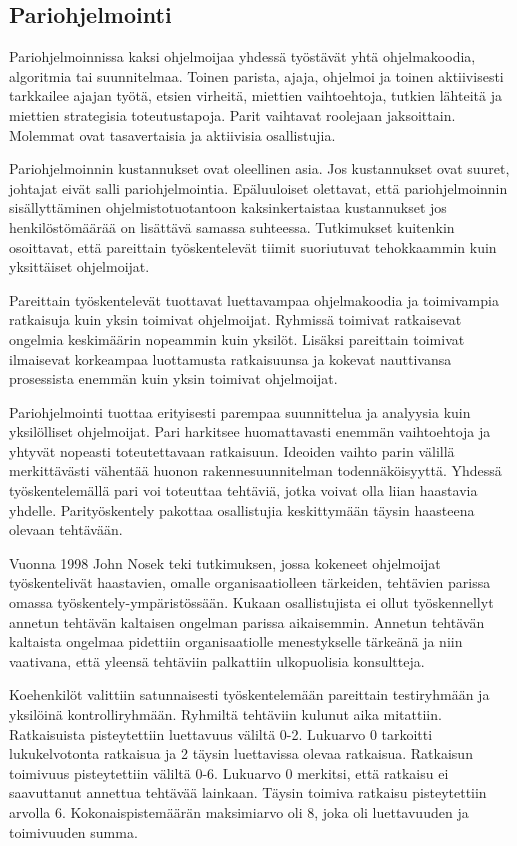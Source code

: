 \documentclass[finnish]{tktltiki2}
\theoremstyle{definition}
\theoremstyle{remark}
\begin{document}
\subsection{Pariohjelmointi}

Pariohjelmoinnissa kaksi ohjelmoijaa yhdessä työstävät yhtä ohjelmakoodia, algoritmia tai suunnitelmaa. Toinen parista, ajaja, ohjelmoi ja toinen aktiivisesti tarkkailee ajajan työtä, etsien virheitä, miettien vaihtoehtoja, tutkien lähteitä ja miettien strategisia toteutustapoja. Parit vaihtavat roolejaan jaksoittain. Molemmat ovat tasavertaisia ja aktiivisia osallistujia\cite{WIL00}.

Pariohjelmoinnin kustannukset ovat oleellinen asia. Jos kustannukset ovat suuret, johtajat eivät salli pariohjelmointia. Epäluuloiset olettavat, että pariohjelmoinnin sisällyttäminen ohjelmistotuotantoon kaksinkertaistaa kustannukset jos henkilöstömäärää on lisättävä samassa suhteessa. Tutkimukset kuitenkin osoittavat, että pareittain työskentelevät tiimit suoriutuvat tehokkaammin kuin yksittäiset ohjelmoijat\cite{NOS98}\cite{WIL00}.

Pareittain työskentelevät tuottavat luettavampaa ohjelmakoodia ja toimivampia ratkaisuja kuin yksin toimivat ohjelmoijat. Ryhmissä toimivat ratkaisevat ongelmia keskimäärin nopeammin kuin yksilöt. Lisäksi pareittain toimivat ilmaisevat korkeampaa luottamusta ratkaisuunsa ja kokevat nauttivansa prosessista enemmän kuin yksin toimivat ohjelmoijat\cite{NOS98}.   

Pariohjelmointi tuottaa erityisesti parempaa suunnittelua ja analyysia kuin yksilölliset ohjelmoijat. Pari harkitsee huomattavasti enemmän vaihtoehtoja ja yhtyvät nopeasti toteutettavaan ratkaisuun. Ideoiden vaihto parin välillä merkittävästi vähentää huonon rakennesuunnitelman todennäköisyyttä.  Yhdessä työskentelemällä pari voi toteuttaa tehtäviä, jotka voivat olla liian haastavia yhdelle. Parityöskentely pakottaa osallistujia keskittymään täysin haasteena olevaan tehtävään\cite{WIL00}.

Vuonna 1998 John Nosek teki tutkimuksen, jossa kokeneet ohjelmoijat työskentelivät haastavien, omalle organisaatiolleen tärkeiden, tehtävien parissa omassa työskentely-ympäristössään. Kukaan osallistujista ei ollut työskennellyt annetun tehtävän kaltaisen ongelman parissa aikaisemmin. Annetun tehtävän kaltaista ongelmaa pidettiin organisaatiolle menestykselle tärkeänä ja niin vaativana, että yleensä tehtäviin palkattiin ulkopuolisia konsultteja\cite{NOS98}.

Koehenkilöt valittiin satunnaisesti työskentelemään pareittain testiryhmään ja yksilöinä kontrolliryhmään.
Ryhmiltä tehtäviin kulunut aika mitattiin. Ratkaisuista pisteytettiin luettavuus väliltä 0-2. Lukuarvo 0 tarkoitti lukukelvotonta ratkaisua ja 2 täysin luettavissa olevaa ratkaisua. Ratkaisun toimivuus pisteytettiin väliltä 0-6. Lukuarvo 0 merkitsi, että ratkaisu ei saavuttanut annettua tehtävää lainkaan. Täysin toimiva ratkaisu pisteytettiin arvolla 6. Kokonaispistemäärän maksimiarvo oli 8, joka oli luettavuuden ja toimivuuden summa\cite{NOS98}.
\end{document}
